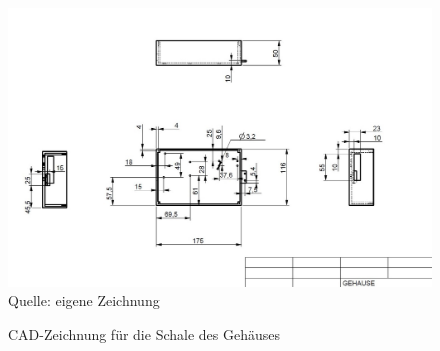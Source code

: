 \begin{figure}[!hbt]
	\centering
	\includegraphics[width=0.9\linewidth]{Images/CAD-Schale}
	\footnotesize \\Quelle: eigene Zeichnung
	\caption{CAD-Zeichnung für die Schale des Gehäuses}
	\label{fig:Zeichnung_Schale}
\end{figure}

